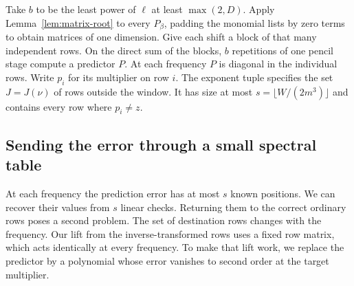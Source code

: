 Take \(b\) to be the least power of \(\ell\) at least \(\max(2,D)\).
Apply Lemma~\ref{lem:matrix-root} to every \(P_\beta\), padding the
monomial lists by zero terms to obtain matrices of one dimension.
Give each shift a block of that many independent rows. On the direct
sum of the blocks, \(b\) repetitions of one pencil stage compute a
predictor \(P\). At each frequency \(P\) is diagonal in the individual
rows. Write \(p_i\) for its multiplier on row \(i\). The exponent tuple
specifies the set \(J=J(\nu)\) of rows outside the window. It has size
at most \(s=\lfloor W/(2m^3)\rfloor\) and contains every row where
\(p_i\ne z\).

\subsection{Sending the error through a small spectral table}

At each frequency the prediction error has at most \(s\) known
positions. We can recover their values from \(s\) linear checks.
Returning them to the correct ordinary rows poses a second problem.
The set of destination rows changes with the frequency. Our lift
from the inverse-transformed rows uses a fixed row matrix, which acts
identically at every frequency. To make that lift work, we replace the
predictor by a polynomial whose error vanishes to second order at the
target multiplier.

